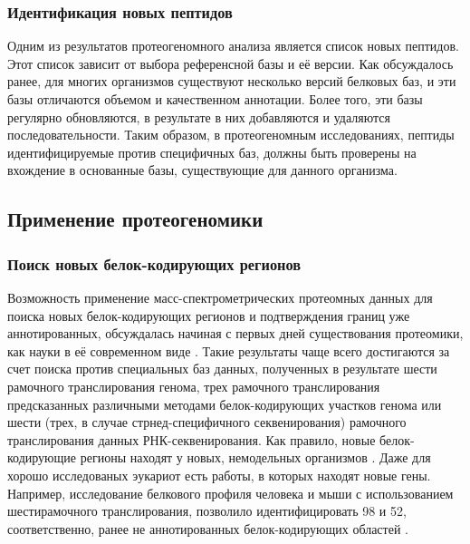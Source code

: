 \subsubsection{Идентификация новых пептидов}
Одним из результатов протеогеномного анализа является список новых пептидов. Этот список зависит от выбора референсной базы и её версии. Как обсуждалось ранее, для многих организмов существуют несколько версий белковых баз, и эти базы отличаются объемом и качественном аннотации. Более того, эти базы регулярно обновляются, в результате в них добавляются и удаляются последовательности. Таким образом, в протеогеномным исследованиях, пептиды идентифицируемые против специфичных баз, должны быть проверены на вхождение в основанные базы, существующие для данного организма.

\subsection{Применение протеогеномики}

\subsubsection{Поиск новых белок-кодирующих регионов}
Возможность применение масс-спектрометрических протеомных данных для поиска новых белок-кодирующих регионов и подтверждения границ уже аннотированных, обсуждалась начиная с первых дней существования протеомики, как науки в её современном виде \cite{choudhary2001interrogating, andersen2001mass}. Такие результаты чаще всего достигаются за счет поиска против специальных баз данных, полученных в результате шести рамочного транслирования генома, трех рамочного транслирования предсказанных различными методами белок-кодирующих участков генома или шести (трех, в случае стрнед-специфичного секвенирования) рамочного транслирования данных РНК-секвенирования. Как правило, новые белок-кодирующие регионы находят у новых, немодельных организмов \cite{castellana2014automated, castellana2008discovery, yang2011discovery}. Даже для хорошо исследованых эукариот есть работы, в которых находят новые гены. Например, исследование белкового профиля человека и мыши с использованием шестирамочного транслирования, позволило идентифицировать 98 и 52, соответственно, ранее не аннотированных белок-кодирующих областей \cite{branca2014hirief}.

